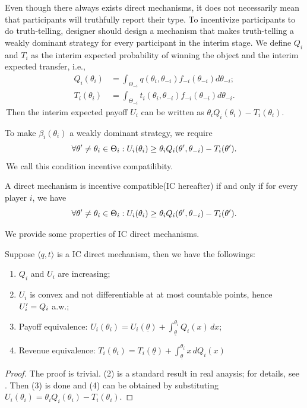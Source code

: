 Even though there always exists direct mechanisms, it does not necessarily mean that participants will truthfully report their type. 
To incentivize participants to do truth-telling, designer should design a mechanism that makes truth-telling a weakly dominant strategy for every participant in the interim stage.
We define $Q_i$ and $T_i$ as the interim expected probability of winning the object and the interim expected transfer, i.e., 
$$\begin{aligned}
    Q_i(\theta_i)&=\int_{\Theta_{-i}} q(\theta_i,\theta_{-i})f_{-i}(\theta_{-i})d \theta_{-i};\\
    T_i(\theta_i)&=\int_{\Theta_{-i}}t_i(\theta_i,\theta_{-i})f_{-i}(\theta_{-i})d \theta_{-i}.
\end{aligned}$$
\,Then the interim expected payoff $U_i$ can be written as $\theta_i Q_i(\theta_i)-T_i(\theta_i)$. 

To make $\beta_i(\theta_i)$ a weakly dominant strategy, we require
$$\forall \theta^{\prime} \neq \theta_i\in \Theta_i : U_i(\theta_i)\geq \theta_i Q_i(\theta^{\prime},\theta_{-i})-T_i(\theta^{\prime}).$$
\,We call this condition incentive compatilibity.
\begin{definition}
    A direct mechanism is incentive compatible(IC hereafter) if and only if for every player $i$, we have 
    $$\forall \theta^{\prime} \neq \theta_i\in \Theta_i : U_i(\theta_i)\geq \theta_i Q_i(\theta^{\prime},\theta_{-i})-T_i(\theta^{\prime}).$$
\end{definition}

We provide some properties of IC direct mechanisms.
\begin{proposition}
    Suppose $\langle q,t \rangle$ is a IC direct mechanism, then we have the followings:
    \begin{enumerate}
        \item $Q_i$ and $U_i$ are increasing;
        \item $U_i$ is convex and not differentiable at at most countable points, hence $U_i^{\prime}=Q_i$ a.w.;
        \item Payoff equivalence: $U_i(\theta_i)=U_i(\underline{\theta})+\int_{\underline{\theta}}^{\theta_i}Q_i(x)\,dx$;
        \item Revenue equivalence: $T_i(\theta_i)=T_i(\underline{\theta})+\int_{\underline{\theta}}^{\theta_i}x \,d Q_i(x)$    
\end{enumerate}
\end{proposition}
\begin{proof}
    The proof is trivial. (2) is a standard result in real anaysis; for details, see \citet[results of....]{Ok2007-mh}. Then (3) is done and (4) can be obtained by substituting $U_i(\theta_i)=\theta_i Q_i(\theta_i)-T_i(\theta_i)$.
\end{proof}

